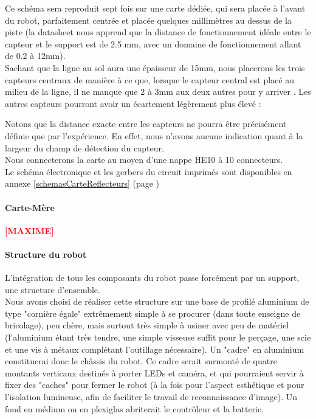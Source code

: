 			Ce schéma sera reproduit sept fois sur une carte dédiée, qui sera placée à l'avant du robot, parfaitement centrée et placée quelques millimètres au dessus de la piste (la datasheet nous apprend que la distance de fonctionnement idéale entre le capteur et le support est de 2.5 mm, avec un domaine de fonctionnement allant de 0.2 à 12mm).\\
			
			Sachant que la ligne au sol aura une épaisseur de 15mm, nous placerons les trois capteurs centraux de manière à ce que, lorsque le capteur central est placé au milieu de la ligne, il ne manque que 2 à 3mm aux deux autres pour y arriver . Les autres capteurs pourront avoir un écartement légèrement plus élevé :


			Notons que la distance exacte entre les capteurs ne pourra être précisément définie que par l'expérience. En effet, nous n'avons aucune indication quant à la largeur du champ de détection du capteur.\\

			Nous connecterons la carte au moyen d'une nappe HE10 à 10 connecteurs.\\

			Le schéma électronique et les gerbers du circuit imprimés sont disponibles en annexe \ref{schemasCarteReflecteurs} (page \pageref{schemasCarteReflecteurs})

		\paragraph{Carte-Mère}\label{carteMere}

			
			\textbf{\Huge{\textcolor{red}{[MAXIME]}}}


		\paragraph{Structure du robot}

			L'intégration de tous les composants du robot passe forcément par un support, une structure d'ensemble.\\
			Nous avons choisi de réaliser cette structure sur une base de profilé aluminium de type "cornière égale" extrêmement simple à se procurer (dans toute enseigne de bricolage), peu chère, mais surtout très simple à usiner avec peu de matériel (l'aluminium étant très tendre, une simple visseuse suffit pour le perçage, une scie et une vis à métaux complétant l'outillage nécessaire).
			Un "cadre" en aluminium constituerai donc le châssis du robot. Ce cadre serait surmonté de quatre montants verticaux destinés à porter LEDs et caméra, et qui pourraient servir à fixer des "caches" pour fermer le robot (à la fois pour l'aspect esthétique et pour l'isolation lumineuse, afin de faciliter le travail de reconnaissance d'image). Un fond en médium ou en plexiglas abriterait le contrôleur et la batterie.\\

